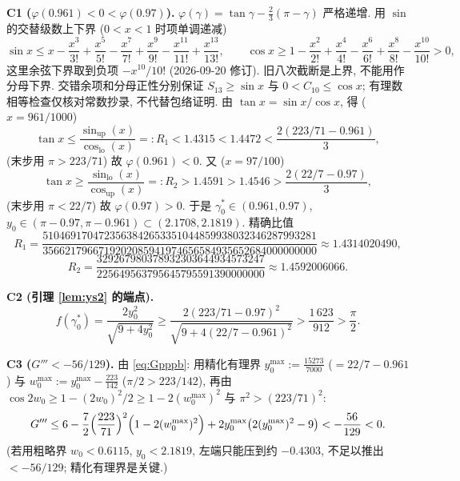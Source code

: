 \documentclass[UTF8]{ctexart}
\begin{document}
\textbf{C1 ($\varphi(0.961)<0<\varphi(0.97)$).}
$\varphi(\gamma)=\tan\gamma-\frac23(\pi-\gamma)$ 严格递增.
用 $\sin$ 的交替级数上下界 ($0<x<1$ 时项单调递减)
\begin{equation*}
	\sin x\le x-\frac{x^3}{3!}+\frac{x^5}{5!}-\frac{x^7}{7!}+\frac{x^9}{9!}
	-\frac{x^{11}}{11!}+\frac{x^{13}}{13!},
	\qquad
	\cos x\ge1-\frac{x^2}{2!}+\frac{x^4}{4!}-\frac{x^6}{6!}+\frac{x^8}{8!}-\frac{x^{10}}{10!}>0,
\end{equation*}
这里余弦下界取到负项 $-x^{10}/10!$ (2026-09-20 修订).
旧八次截断是上界, 不能用作分母下界. 交错余项和分母正性分别保证
$S_{13}\ge\sin x$ 与 $0<C_{10}\le\cos x$; 有理数相等检查仅核对常数抄录,
不代替包络证明. 由 $\tan x=\sin x/\cos x$, 得 ($x=961/1000$)
\begin{equation*}
	\tan x\le\frac{\sin_{\text{up}}(x)}{\cos_{\text{lo}}(x)}=:R_1
	<1.4315<1.4472<\frac{2(223/71-0.961)}3,
\end{equation*}
(末步用 $\pi>223/71$) 故 $\varphi(0.961)<0$. 又 ($x=97/100$)
\begin{equation*}
	\tan x\ge\frac{\sin_{\text{lo}}(x)}{\cos_{\text{up}}(x)}=:R_2
	>1.4591>1.4546>\frac{2(22/7-0.97)}3,
\end{equation*}
(末步用 $\pi<22/7$) 故 $\varphi(0.97)>0$. 于是 $\gamma_0^*\in(0.961,0.97)$,
$y_0\in(\pi-0.97,\pi-0.961)\subset(2.1708,2.1819)$. 精确比值
\begin{equation*}
	R_1=\frac{5104691704723563842653351044859938032346287993281}
	{3566217966719202085941974656584935652684000000000}
	\approx1.4314020490,
\end{equation*}
\begin{equation*}
	R_2=\frac{329267980378932303644934573247}
	{225649563795645795591390000000}\approx1.4592006066.
\end{equation*}

\textbf{C2 (引理 \ref{lem:ys2} 的端点).}
\begin{equation*}
	f(\gamma_0^*)=\frac{2y_0^2}{\sqrt{9+4y_0^2}}
	\ge\frac{2(223/71-0.97)^2}{\sqrt{9+4(22/7-0.961)^2}}
	>\frac{1\,623}{912}>\frac\pi2.
\end{equation*}

\textbf{C3 ($G'''<-56/129$).} 由 \eqref{eq:Gpppb}: 用精化有理界
$y_0^{\max}:=\frac{15273}{7000}$ ($=22/7-0.961$) 与
$w_0^{\max}:=y_0^{\max}-\frac{223}{142}$ ($\pi/2>223/142$),
再由 $\cos2w_0\ge1-(2w_0)^2/2\ge1-2(w_0^{\max})^2$ 与
$\pi^2>(223/71)^2$:
\begin{equation*}
	G'''\le6-\frac{7}{2}\Bigl(\frac{223}{71}\Bigr)^2
	\Bigl(1-2(w_0^{\max})^2\Bigr)+2y_0^{\max}
	\bigl(2(y_0^{\max})^2-9\bigr)
	<-\frac{56}{129}<0.
\end{equation*}
(若用粗略界 $w_0<0.6115$, $y_0<2.1819$, 左端只能压到约 $-0.4303$, 不足以推出
$<-56/129$; 精化有理界是关键.)
\end{document}
